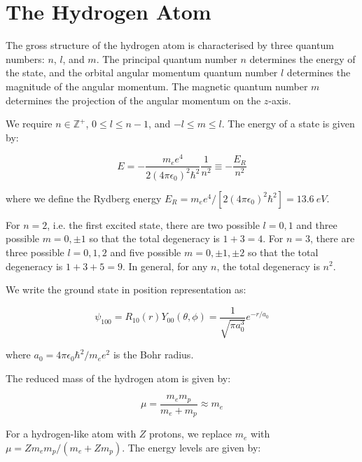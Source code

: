 \documentclass[12pt]{article}
\begin{document}



\pagebreak
\section*{The Hydrogen Atom}


The gross structure of the hydrogen atom is characterised by three quantum numbers: $n$, $l$, and $m$. The principal quantum number $n$ determines the energy of the state, and the orbital angular momentum quantum number $l$ determines the magnitude of the angular momentum. The magnetic quantum number $m$ determines the projection of the angular momentum on the $z$-axis.

We require $n \in \mathbb{Z}^+$, $0 \leq l \leq n - 1$, and $-l \leq m \leq l$. The energy of a state is given by:

\begin{equation}
    E = - \frac{m_{e} e^{4}}{2 (4 \pi \epsilon_{0})^{2} \hbar^{2}} \frac{1}{n^{2}} \equiv - \frac{E_{R}}{n^{2}}
\end{equation}

where we define the Rydberg energy $E_{R} = m_{e} e^{4}/[2 (4 \pi \epsilon_{0})^{2} \hbar^{2}]= \qty{13.6}{eV}$.

For $n = 2$, i.e. the first excited state, there are two possible $l = 0, 1$ and three possible $m = 0, \pm 1$ so that the total degeneracy is $1 + 3 = 4$. For $n = 3$, there are three possible $l = 0, 1, 2$ and five possible $m = 0, \pm 1, \pm 2$ so that the total degeneracy is $1 + 3 + 5 = 9$. In general, for any $n$, the total degeneracy is $n^{2}$.

We write the ground state in position representation as:

\begin{equation}
    \psi_{100} = R_{10}(r) Y_{00}(\theta, \phi) = \frac{1}{\sqrt{\pi a_{0}^{3}}} e^{-r/a_{0}}
\end{equation}

where $a_{0} = 4 \pi \epsilon_{0} \hbar^{2}/m_{e} e^{2}$ is the Bohr radius.

The reduced mass of the hydrogen atom is given by:

\begin{equation}
    \mu = \frac{m_{e} m_{p}}{m_{e} + m_{p}} \approx m_{e}
\end{equation}

For a hydrogen-like atom with $Z$ protons, we replace $m_{e}$ with $\mu = Zm_{e} m_{p} /(m_{e} + Z m_{p})$. The energy levels are given by:
\end{document}
